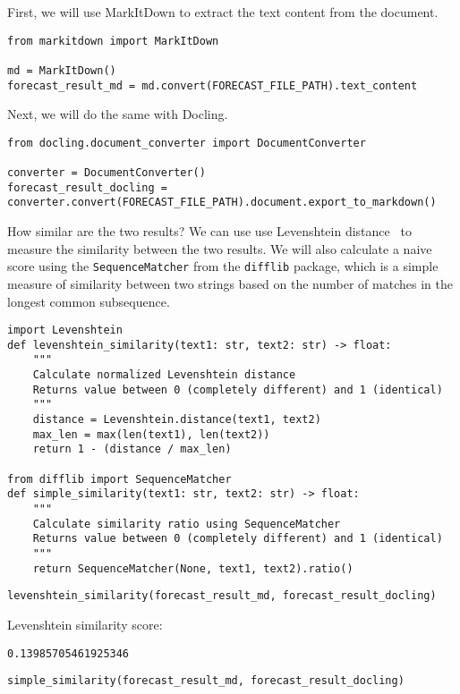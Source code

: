 First, we will use MarkItDown to extract the text content from the document.

\begin{verbatim}
from markitdown import MarkItDown

md = MarkItDown()
forecast_result_md = md.convert(FORECAST_FILE_PATH).text_content
\end{verbatim}

Next, we will do the same with Docling.

\begin{verbatim}
from docling.document_converter import DocumentConverter

converter = DocumentConverter()
forecast_result_docling = converter.convert(FORECAST_FILE_PATH).document.export_to_markdown()
\end{verbatim}
How similar are the two results? We can use use Levenshtein distance~ to measure the similarity between the two results. We will also calculate a naive score using the \texttt{SequenceMatcher} from the \texttt{difflib} package, which is a simple measure of similarity between two strings based on the number of matches in the longest common subsequence.

\begin{verbatim}
import Levenshtein
def levenshtein_similarity(text1: str, text2: str) -> float:
    """
    Calculate normalized Levenshtein distance
    Returns value between 0 (completely different) and 1 (identical)
    """
    distance = Levenshtein.distance(text1, text2)
    max_len = max(len(text1), len(text2))
    return 1 - (distance / max_len)

from difflib import SequenceMatcher
def simple_similarity(text1: str, text2: str) -> float:
    """
    Calculate similarity ratio using SequenceMatcher
    Returns value between 0 (completely different) and 1 (identical)
    """
    return SequenceMatcher(None, text1, text2).ratio()
\end{verbatim}

\begin{verbatim}
levenshtein_similarity(forecast_result_md, forecast_result_docling)
\end{verbatim}

Levenshtein similarity score:
\begin{verbatim}
0.13985705461925346
\end{verbatim}


\begin{verbatim}
simple_similarity(forecast_result_md, forecast_result_docling)
\end{verbatim}

